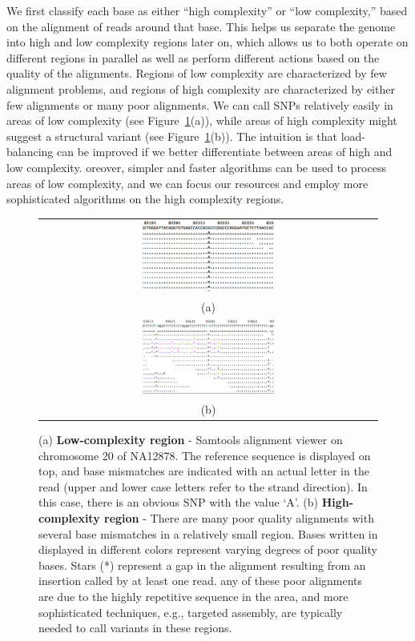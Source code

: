 \documentclass[10pt]{article}
\begin{document}
We first classify each base as either ``high complexity'' or ``low complexity,'' based on the alignment of reads around that base.
This helps us separate the genome into high and low complexity regions later on, which allows us to both operate on different regions in parallel as well as perform different actions based on the quality of the alignments.
Regions of low complexity are characterized by few alignment problems, and regions of high complexity are characterized by either few alignments or many poor alignments.
We can call SNPs relatively easily in
areas of low complexity (see Figure~\ref{low-complexity}(a)), while areas of
high complexity might suggest a structural variant (see
Figure~\ref{low-complexity}(b)).
The intuition is that load-balancing can be improved if we better differentiate between areas of high and low complexity.
oreover, simpler and faster algorithms can be used to process areas of low complexity, and we can focus our resources and employ more sophisticated algorithms on the high complexity regions.

\begin{figure}[h!]
\begin{center}
\begin{tabular} {@{}c@{}}
  \includegraphics[width=0.40\textwidth]{figs/snp.png} \\ %
   (a) \\
  \includegraphics[width=0.40\textwidth]{figs/high-weirdness.png} \\
   (b) \\
\end{tabular}
\end{center}
\caption{(a) \textbf{Low-complexity region} - Samtools alignment viewer on
chromosome 20 of NA12878.  The reference sequence is displayed on top, and base
mismatches are indicated with an actual letter in the read (upper and lower
case letters refer to the strand direction).  In this case, there is an obvious
SNP with the value `A'. (b) \textbf{High-complexity region} - There are many
poor quality alignments with several base mismatches in a relatively small
region. Bases written in displayed in different colors represent varying degrees of poor quality bases. Stars (*) represent a gap in the alignment resulting from an insertion called by at least one read. any of these poor alignments are due to the highly repetitive
sequence in the area, and more sophisticated techniques, e.g., targeted assembly,
are typically needed to call variants in these regions.  }
  \label{low-complexity}
\end{figure}
\end{document}
